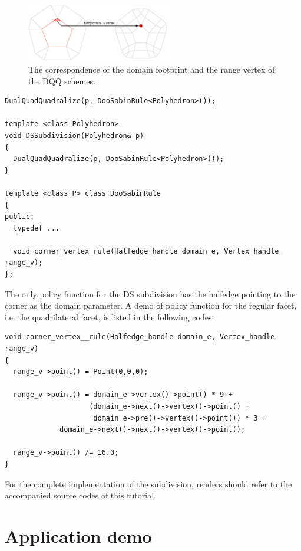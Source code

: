 \documentclass[letter,twoside,10pt]{article}
\begin{document}
\begin{figure}
  \centering
  \includegraphics[width=2.5in]{pfigs/DQQRefMap.eps}
  \caption{The correspondence of the domain footprint and the 
           range vertex of the DQQ schemes.}
  \label{fig:DQQMap}
\end{figure}


{\scriptsize
\begin{verbatim}
DualQuadQuadralize(p, DooSabinRule<Polyhedron>());

template <class Polyhedron>
void DSSubdivision(Polyhedron& p) 
{ 
  DualQuadQuadralize(p, DooSabinRule<Polyhedron>());
}

template <class P> class DooSabinRule 
{
public:
  typedef ...

  void corner_vertex_rule(Halfedge_handle domain_e, Vertex_handle range_v);
};
\end{verbatim}
}

The only policy function for the DS subdivision has the halfedge
pointing to the corner as the domain parameter. A demo of policy
function for the regular facet, i.e. the quadrilateral facet, is
listed in the following codes.

{\scriptsize
\begin{verbatim}
void corner_vertex__rule(Halfedge_handle domain_e, Vertex_handle range_v) 
{
  range_v->point() = Point(0,0,0);

  range_v->point() = domain_e->vertex()->point() * 9 + 
                    (domain_e->next()->vertex()->point() +
                     domain_e->pre()->vertex()->point()) * 3 +
		     domain_e->next()->next()->vertex()->point();
  
  range_v->point() /= 16.0;
}
\end{verbatim}
}

For the complete implementation of the subdivision, readers should
refer to the accompanied source codes of this tutorial.

\section{Application demo}
\end{document}
